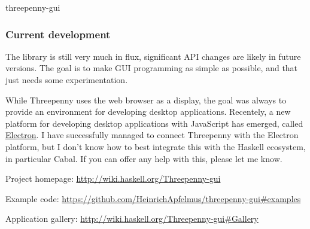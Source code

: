 \begin{hcarentry}[updated]{threepenny-gui}
\subsubsection*{Current development}

The library is still very much in flux, significant API changes are likely in future versions. The goal is to make GUI programming as simple as possible, and that just needs some experimentation.

While Threepenny uses the web browser as a display, the goal was always to provide an environment for developing desktop applications. Recentely, a new platform for developing desktop applications with JavaScript has emerged, called \href{http://electron.atom.io/}{Electron}. I have successfully managed to connect Threepenny with the Electron platform, but I don't know how to best integrate this with the Haskell ecosystem, in particular Cabal. If you can offer any help with this, please let me know.

\FurtherReading
\begin{compactitem}
\item Project homepage: \url{http://wiki.haskell.org/Threepenny-gui}
\item Example code: \url{https://github.com/HeinrichApfelmus/threepenny-gui#examples}
\item Application gallery: \url{http://wiki.haskell.org/Threepenny-gui#Gallery}
\end{compactitem}
\end{hcarentry}
